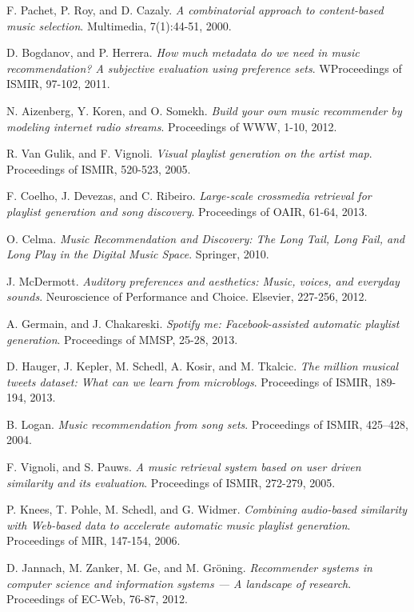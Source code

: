 \documentclass[11pt, oneside, openright]{Thesis} %
\begin{document}
\begin{thebibliography}{99}
F. Pachet, P. Roy, and D. Cazaly.
\textit{A combinatorial approach to content-based music selection}.
Multimedia, 7(1):44-51, 2000.

D. Bogdanov, and P. Herrera.
\textit{How much metadata do we need in music recommendation? A subjective evaluation using preference sets}.
WProceedings of ISMIR, 97-102, 2011.

N. Aizenberg, Y. Koren, and O. Somekh.
\textit{Build your own music recommender by modeling internet radio streams}.
Proceedings of WWW, 1-10, 2012.

R. Van Gulik, and F. Vignoli.
\textit{Visual playlist generation on the artist map}.
Proceedings of ISMIR, 520-523, 2005.

F. Coelho, J. Devezas, and C. Ribeiro.
\textit{Large-scale crossmedia retrieval for playlist generation and song discovery}.
Proceedings of OAIR, 61-64, 2013.

O. Celma. 
\textit{Music Recommendation and Discovery: The Long Tail, Long Fail, and Long Play in the Digital Music Space}.
Springer, 2010.

J. McDermott.
\textit{Auditory preferences and aesthetics: Music, voices, and everyday sounds}.
Neuroscience of Performance and Choice. Elsevier, 227-256, 2012.

A. Germain, and J. Chakareski.
\textit{Spotify me: Facebook-assisted automatic playlist generation}.
Proceedings of MMSP, 25-28, 2013.

D. Hauger, J. Kepler, M. Schedl, A. Kosir, and M. Tkalcic.
\textit{The million musical tweets dataset: What can we learn from microblogs}.
Proceedings of ISMIR, 189-194, 2013.

B. Logan. 
\textit{Music recommendation from song sets}.
Proceedings of ISMIR, 425–428, 2004.

F. Vignoli, and S. Pauws.
\textit{A music retrieval system based on user driven similarity and its evaluation}.
Proceedings of ISMIR, 272-279, 2005.

P. Knees, T. Pohle, M. Schedl, and G. Widmer.
\textit{Combining audio-based similarity with Web-based data to accelerate automatic music playlist generation}.
Proceedings of MIR, 147-154, 2006.

D. Jannach, M. Zanker, M. Ge, and M. Gr\"{o}ning.
\textit{Recommender systems in computer science and information systems — A landscape of research}.
Proceedings of EC-Web, 76-87, 2012.


\end{thebibliography}
\end{document}

